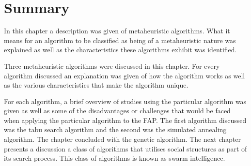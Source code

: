 \section {Summary}
In this chapter a description was given of metaheuristic algorithms. What it means for an algorithm to be classified as being of a metaheuristic nature was explained as well as the characteristics these algorithms exhibit was identified.

Three metaheuristic algorithms were discussed in this chapter. For every algorithm discussed an explanation was given of how the algorithm works as well as the various characteristics that make the algorithm unique.

For each algorithm, a brief overview of studies using the particular algorithm was given as well as some of the disadvantages or challenges that would be faced when applying the particular algorithm to the \gls{FAP}.
The first algorithm discussed was the tabu search algorithm and the second was the simulated annealing algorithm. The chapter concluded with the genetic algorithm. 
The next chapter presents a discussion a class of algorithms that utilises social structures as part of its search process. This class of algorithms is known as swarm intelligence.

